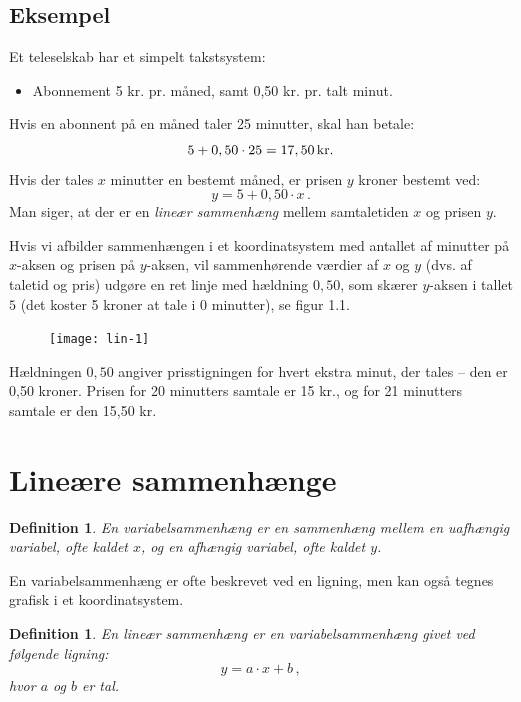 \documentclass[12pt,oneside,a4paper]{article}
\newtheorem{mydef}[thm]{Definition}
\begin{document}
\begin{tcolorbox}
\subsection{Eksempel}
Et teleselskab har et simpelt takstsystem:
\begin{itemize}
    \item Abonnement 5 kr. pr. måned, samt 0,50 kr. pr. talt minut.
\end{itemize}
Hvis en abonnent på en måned taler 25 minutter, skal han betale:
$$
5 + 0,50\cdot25 = 17,50 \, {\rm kr}.
$$
Hvis der tales $x$ minutter en bestemt måned, er prisen $y$ kroner bestemt ved:
$$
y = 5 + 0,50\cdot x \,.
$$
Man siger, at der er en {\em lineær sammenhæng} mellem samtaletiden $x$ og prisen $y$.

Hvis vi afbilder sammenhængen i et koordinatsystem med antallet af minutter på
$x$-aksen og prisen på $y$-aksen, vil sammenhørende værdier af $x$ og $y$ (dvs.
af taletid og pris) udgøre en ret linje med hældning $0,50$, som skærer
$y$-aksen i tallet $5$ (det koster 5 kroner at tale i 0 minutter), se figur
1.1.

\begin{figure}[H]
    \centering
    \texttt{[image: lin-1]}
    \caption{}
\end{figure}

Hældningen $0,50$ angiver prisstigningen for hvert ekstra minut, der tales --
den er 0,50 kroner.  Prisen for 20 minutters samtale er 15 kr., og for 21
minutters samtale er den 15,50 kr.
\end{tcolorbox}



\section{Lineære sammenhænge}
\begin{tcolorbox}
\begin{mydef}
    En {\em variabelsammenhæng} er en sammenhæng mellem en uafhængig variabel, ofte
    kaldet $x$, og en afhængig variabel, ofte kaldet $y$.
\end{mydef}
\end{tcolorbox}

En variabelsammenhæng er ofte beskrevet ved en ligning, men kan også tegnes grafisk i et
koordinatsystem.

\begin{tcolorbox}
\begin{mydef}
    En {\em lineær sammenhæng} er en variabelsammenhæng givet ved følgende ligning:
    $$
    y = a\cdot x + b \,,
    $$
    hvor $a$ og $b$ er tal.
\end{mydef}
\end{tcolorbox}
\end{document}
